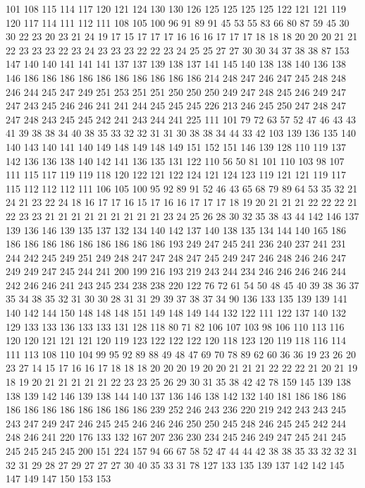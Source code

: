 101 108 115 114 117 120 121 124 130 130 126 125 125 125 125 122 121 121 119 120
117 114 111 112 111 108 105 100 96 91 89 91 45 53 55 83 66 80 87 59
45 30 30 22 23 20 23 21 24 19 17 15 17 17 17 16 16 16 17 17
17 18 18 18 20 20 20 21 21 22 23 23 23 22 23 24 23 23 23 22
22 23 24 25 25 27 27 30 30 34 37 38 38 87 153 147 140 140 141 141
141 137 137 139 138 137 141 145 140 138 138 140 136 138 146 186 186 186 186 186
186 186 186 186 186 214 248 247 246 247 245 248 248 246 244 245 247 249 251 253
251 251 250 250 250 249 247 248 245 246 249 247 247 243 245 246 246 241 241 244
245 245 245 226 213 246 245 250 247 248 247 247 248 243 245 245 242 241 243 244
241 225 111 101 79 72 63 57 52 47 46 43 43 41 39 38 38 34 40 38
35 33 32 32 31 31 30 38 38 34 44 33 42 103 139 136 135 140 140 143
140 141 140 149 148 149 148 149 151 152 151 146 139 128 110 119 137 142 136 136
138 140 142 141 136 135 131 122 110 56 50 81 101 110 103 98 107 111 115 117
119 119 118 120 122 121 122 124 121 124 123 119 121 121 119 117 115 112 112 112
111 106 105 100 95 92 89 91 52 46 43 65 68 79 89 64 53 35 32 21
24 21 23 22 24 18 16 17 17 16 15 17 16 16 17 17 17 18 19 20
21 21 21 22 22 22 21 22 23 23 21 21 21 21 21 21 21 21 21 23
24 25 26 28 30 32 35 38 43 44 142 146 137 139 136 146 139 135 137 132
134 140 142 137 140 138 135 134 144 140 165 186 186 186 186 186 186 186 186 186
186 193 249 247 245 241 236 240 237 241 231 244 242 245 249 251 249 248 247 247
248 247 245 249 247 246 248 246 246 247 249 249 247 245 244 241 200 199 216 193
219 243 244 234 246 246 246 246 244 242 246 246 241 243 245 234 238 238 220 122
76 72 61 54 50 48 45 40 39 38 36 37 35 34 38 35 32 31 30 30
28 31 31 29 39 37 38 37 34 90 136 133 135 139 139 141 140 142 144 150
148 148 148 151 149 148 149 144 132 122 111 122 137 140 132 129 133 133 136 133
133 131 128 118 80 71 82 106 107 103 98 106 110 113 116 120 120 121 121 121
120 119 123 122 122 122 120 118 123 120 119 118 116 114 111 113 108 110 104 99
95 92 89 88 49 48 47 69 70 78 89 62 60 36 36 19 23 26 20 23
27 14 15 17 16 16 17 18 18 18 20 20 20 19 20 20 21 21 21 22
22 22 21 20 21 19 18 19 20 21 21 21 21 21 22 23 23 25 26 29
30 31 35 38 42 42 78 159 145 139 138 138 139 142 146 139 138 144 140 137
136 146 138 142 132 140 181 186 186 186 186 186 186 186 186 186 186 186 239 252
246 243 236 220 219 242 243 243 245 243 247 249 247 246 245 245 246 246 246 250
250 245 248 246 245 245 242 244 248 246 241 220 176 133 132 167 207 236 230 234
245 246 249 247 245 241 245 245 245 245 245 200 151 224 157 94 66 67 58 52
47 44 44 42 38 38 35 33 32 32 31 32 31 29 28 27 29 27 27 27
30 40 35 33 31 78 127 133 135 139 137 142 142 145 147 149 147 150 153 153
